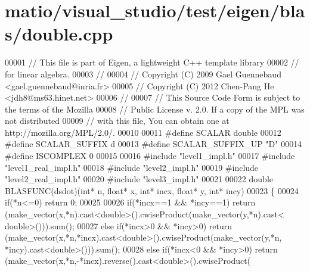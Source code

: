 \hypertarget{matio_2visual__studio_2test_2eigen_2blas_2double_8cpp_source}{}\section{matio/visual\+\_\+studio/test/eigen/blas/double.cpp}
\label{matio_2visual__studio_2test_2eigen_2blas_2double_8cpp_source}

\begin{DoxyCode}
00001 \textcolor{comment}{// This file is part of Eigen, a lightweight C++ template library}
00002 \textcolor{comment}{// for linear algebra.}
00003 \textcolor{comment}{//}
00004 \textcolor{comment}{// Copyright (C) 2009 Gael Guennebaud <gael.guennebaud@inria.fr>}
00005 \textcolor{comment}{// Copyright (C) 2012 Chen-Pang He <jdh8@ms63.hinet.net>}
00006 \textcolor{comment}{//}
00007 \textcolor{comment}{// This Source Code Form is subject to the terms of the Mozilla}
00008 \textcolor{comment}{// Public License v. 2.0. If a copy of the MPL was not distributed}
00009 \textcolor{comment}{// with this file, You can obtain one at http://mozilla.org/MPL/2.0/.}
00010 
00011 \textcolor{preprocessor}{#define SCALAR        double}
00012 \textcolor{preprocessor}{#define SCALAR\_SUFFIX d}
00013 \textcolor{preprocessor}{#define SCALAR\_SUFFIX\_UP "D"}
00014 \textcolor{preprocessor}{#define ISCOMPLEX     0}
00015 
00016 \textcolor{preprocessor}{#include "level1\_impl.h"}
00017 \textcolor{preprocessor}{#include "level1\_real\_impl.h"}
00018 \textcolor{preprocessor}{#include "level2\_impl.h"}
00019 \textcolor{preprocessor}{#include "level2\_real\_impl.h"}
00020 \textcolor{preprocessor}{#include "level3\_impl.h"}
00021 
00022 \textcolor{keywordtype}{double} BLASFUNC(dsdot)(\textcolor{keywordtype}{int}* n, \textcolor{keywordtype}{float}* x, \textcolor{keywordtype}{int}* incx, \textcolor{keywordtype}{float}* y, \textcolor{keywordtype}{int}* incy)
00023 \{
00024   \textcolor{keywordflow}{if}(*n<=0) \textcolor{keywordflow}{return} 0;
00025 
00026   \textcolor{keywordflow}{if}(*incx==1 && *incy==1)    \textcolor{keywordflow}{return} (make\_vector(x,*n).cast<\textcolor{keywordtype}{double}>().cwiseProduct(make\_vector(y,*n).cast<\textcolor{keywordtype}{
      double}>())).sum();
00027   \textcolor{keywordflow}{else} \textcolor{keywordflow}{if}(*incx>0 && *incy>0) \textcolor{keywordflow}{return} (make\_vector(x,*n,*incx).cast<\textcolor{keywordtype}{double}>().cwiseProduct(make\_vector(y,*n,
      *incy).cast<\textcolor{keywordtype}{double}>())).sum();
00028   \textcolor{keywordflow}{else} \textcolor{keywordflow}{if}(*incx<0 && *incy>0) \textcolor{keywordflow}{return} (make\_vector(x,*n,-*incx).reverse().cast<\textcolor{keywordtype}{double}>().cwiseProduct(

\end{DoxyCode}
